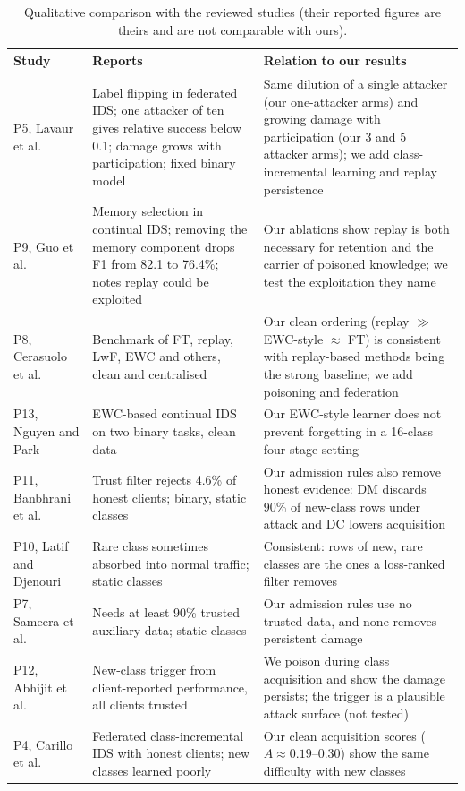 \documentclass[10pt,a4paper]{article}
\begin{document}
\begin{table}[htbp]
\centering\footnotesize
\caption{Qualitative comparison with the reviewed studies (their reported figures are theirs and are not comparable with ours).}
\label{tab:lit}
\begin{tabularx}{\linewidth}{L{2.4cm}L{4.3cm}Y}
\toprule
Study & Reports & Relation to our results\\
\midrule
P5, Lavaur et al.\ \cite{lavaur} & Label flipping in federated IDS; one attacker of ten gives relative success below 0.1; damage grows with participation; fixed binary model & Same dilution of a single attacker (our one-attacker arms) and growing damage with participation (our 3 and 5 attacker arms); we add class-incremental learning and replay persistence\\
P9, Guo et al.\ \cite{guo} & Memory selection in continual IDS; removing the memory component drops F1 from 82.1 to 76.4\%; notes replay could be exploited & Our ablations show replay is both necessary for retention and the carrier of poisoned knowledge; we test the exploitation they name\\
P8, Cerasuolo et al.\ \cite{cerasuolo} & Benchmark of FT, replay, LwF, EWC and others, clean and centralised & Our clean ordering (replay $\gg$ EWC-style $\approx$ FT) is consistent with replay-based methods being the strong baseline; we add poisoning and federation\\
P13, Nguyen and Park \cite{elgnn} & EWC-based continual IDS on two binary tasks, clean data & Our EWC-style learner does not prevent forgetting in a 16-class four-stage setting\\
P11, Banbhrani et al.\ \cite{flzt} & Trust filter rejects 4.6\% of honest clients; binary, static classes & Our admission rules also remove honest evidence: DM discards 90\% of new-class rows under attack and DC lowers acquisition\\
P10, Latif and Djenouri \cite{amm} & Rare class sometimes absorbed into normal traffic; static classes & Consistent: rows of new, rare classes are the ones a loss-ranked filter removes\\
P7, Sameera et al.\ \cite{wei} & Needs at least 90\% trusted auxiliary data; static classes & Our admission rules use no trusted data, and none removes persistent damage\\
P12, Abhijit et al.\ \cite{rare} & New-class trigger from client-reported performance, all clients trusted & We poison during class acquisition and show the damage persists; the trigger is a plausible attack surface (not tested)\\
P4, Carillo et al.\ \cite{carillo} & Federated class-incremental IDS with honest clients; new classes learned poorly & Our clean acquisition scores ($A\approx0.19$--$0.30$) show the same difficulty with new classes\\
\bottomrule
\end{tabularx}
\end{table}
\end{document}
